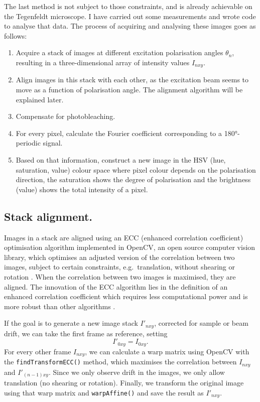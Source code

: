 The last method is not subject to those constraints, and is already achievable on the Tegenfeldt microscope. I have carried out some measurements and wrote code to analyse that data. The process of acquiring and analysing these images goes as follows:
\begin{enumerate}
	\item Acquire a stack of images at different excitation polarisation angles $ \theta_n $, resulting in a three-dimensional array of intensity values $ I_{nxy} $.
	\item Align images in this stack with each other, as the excitation beam seems to move as a function of polarisation angle. The alignment algorithm will be explained later.
	\item Compensate for photobleaching.
	\item For every pixel, calculate the Fourier coefficient corresponding to a \ang{180}-periodic signal.
	\item Based on that information, construct a new image in the HSV (hue, saturation, value) colour space where pixel colour depends on the polarisation direction, the saturation shows the degree of polarisation and the brightness (value) shows the total intensity of a pixel. 

\end{enumerate}

\subsection{Stack alignment.} Images in a stack are aligned using an ECC (enhanced correlation coefficient) optimisation algorithm implemented in OpenCV, an open source computer vision library, which optimises an adjusted version of the correlation between two images, subject to certain constraints, e.g.~translation, without shearing or rotation \cite{Evangelidis2008}. When the correlation between two images is maximised, they are aligned. The innovation of the ECC algorithm lies in the definition of an enhanced correlation coefficient which requires less computational power and is more robust than other algorithms \cite{Evangelidis2008}. 

If the goal is to generate a new image stack $ I'_{nxy} $, corrected for sample or beam drift, we can take the first frame as reference, setting 
\begin{equation}
	I'_{0xy} = I_{0xy}.
\end{equation}
For every other frame $ I_{nxy} $, we can calculate a warp matrix using OpenCV with the \texttt{findTransformECC()} method, which maximises the correlation between $ I_{nxy} $ and $ I'_{(n-1)xy} $. Since we only observe drift in the images, we only allow translation (no shearing or rotation). Finally, we transform the original image using that warp matrix and \texttt{warpAffine()} and save the result as $ I'_{nxy} $.

